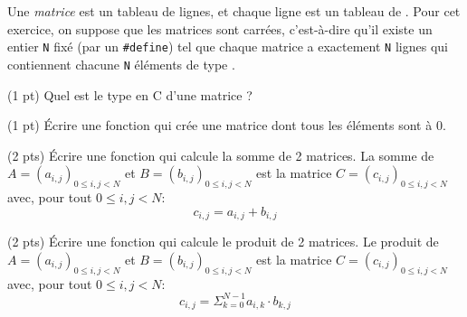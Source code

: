 


Une \emph{matrice} est un tableau de lignes, et chaque ligne est un
tableau de \cfloat. Pour cet exercice, on suppose que les matrices
sont carrées, c'est-à-dire qu'il existe un entier \texttt{N} fixé (par
un \verb+#define+) tel que chaque matrice a exactement \texttt{N}
lignes qui contiennent chacune \texttt{N} éléments de type \cfloat.

\question (1 pt) Quel est le type en C d'une matrice ?

\question (1 pt) Écrire une fonction  qui crée une matrice
dont tous les éléments sont à \(0\).

\question (2 pts) Écrire une fonction qui calcule la somme de 2 matrices.
La somme de \(A = ( a_{i,j})_{0\le i,j < N} \) et \(B = ( b_{i,j})_{0\le i,j < N} \)
est la matrice \(C = ( c_{i,j})_{0\le i,j < N} \) avec, pour tout \(0\le i,j < N\):
\[
c_{i,j} = a_{i,j} + b_{i,j}
\]

\question (2 pts) Écrire une fonction qui calcule le produit de 2 matrices.
Le produit de \(A = ( a_{i,j})_{0\le i,j < N} \) et \(B = ( b_{i,j})_{0\le i,j < N} \)
est la matrice \(C = ( c_{i,j})_{0\le i,j < N} \) avec, pour tout \(0\le i,j < N\):
\[
c_{i,j} = \Sigma_{k=0}^{N-1} a_{i,k} \cdot b_{k,j}
\]
